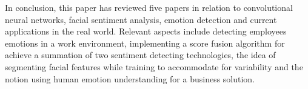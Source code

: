 In conclusion, this paper has reviewed five papers in relation to convolutional neural networks, facial sentiment analysis, emotion detection and current applications in the real world. Relevant aspects include detecting employees emotions in a work environment, implementing a score fusion algorithm for achieve a summation of two sentiment detecting technologies, the idea of segmenting facial features while training to accommodate for variability and the notion using human emotion understanding for a business solution.